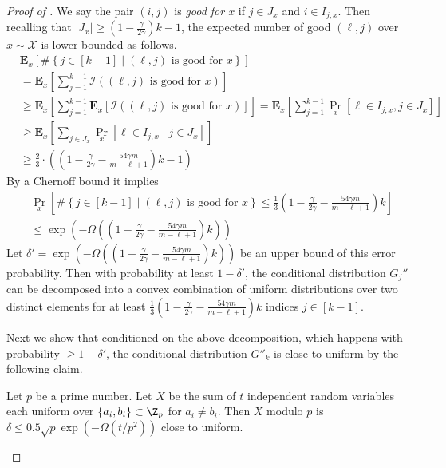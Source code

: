 \documentclass{toc}
\newcommand{\set}[1]{{\left \{{#1} \right \}}}
\newcommand{\st}{\;|\;}
\newcommand{\cond}{\;|\;}
\newcommand{\follows}{\ensuremath{\sim}}
\newcommand{\error}{\ensuremath{\delta}}
\newcommand{\bigomega}[1]{\ensuremath{{\Omega \left( {#1} \right)}}}
\newcommand{\E}{\ensuremath{\mathbf{E}}}
\begin{document}
\begin{proof}[Proof of ]
		We say the pair $(i,j)$ is \emph{good for $x$} if $j\in J_{x}$ and $i\in I_{j,x}$.
		Then recalling that $|J_x|\ge \left(1-\frac{\gamma}{2\gamma}\right)k-1$, the expected number of good $(\ell,j)$ over $x\follows\mathcal{X}$ is lower bounded as follows.
		\begin{align*}
			& \E_x\left[ \#\set{j\in [k-1]\st \text{$(\ell,j)$ is good for $x$}} \right]  \\
			&= \E_x\left[ \sum_{j=1}^{k-1} \mathcal{I}\left(\text{$(\ell,j)$ is good for $x$}\right) \right] \\
			&\ge  \E_x\left[ \sum_{j=1}^{k-1} \E_x\left[\mathcal{I}\left(\text{$(\ell,j)$ is good for $x$}\right)\right] \right] 
			= \E_x\left[ \sum_{j=1}^{k-1} \Pr_x[\ell \in I_{j,x}, j\in J_x] \right]\\
			&\ge  \E_x\left[ \sum_{j\in J_x} \Pr_x[\ell \in I_{j,x}\cond j\in J_x] \right] \\
			&\ge  \frac{2}{3}\cdot\left(\left(1-\frac{\gamma}{2\gamma}- \frac {54\gamma m}{m-\ell+1}\right)k-1\right)
		\end{align*}
		By a Chernoff bound it implies
		\begin{align*}
			& \Pr_x\left[ \#\set{j\in [k-1]\st \text{$(\ell,j)$ is good for $x$}} \le \frac{1}{3} \left(1-\frac{\gamma}{2\gamma} - \frac {54\gamma m}{m-\ell+1}\right)k \right]\\
		&\le \exp\left( -\bigomega{\left(1-\frac{\gamma}{2\gamma}- \frac {54\gamma m}{m-\ell+1}\right)k} \right)
		\end{align*}
		Let $\error' = \exp\left( -\bigomega{\left(1-\frac{\gamma}{2\gamma}- \frac {54\gamma m}{m-\ell+1}\right)k} \right)$ be an upper bound of this error probability.
		Then with probability at least $1-\error'$, the conditional distribution %
		$G_j''$ can be decomposed into a convex combination of uniform distributions over two distinct elements for at least $\frac{1}{3} \left(1-\frac{\gamma}{2\gamma}- \frac {54\gamma m}{m-\ell+1}\right)k$ indices $j\in [k-1]$.

		Next we show that conditioned on the above decomposition, 
		which happens with probability $\ge 1-\error'$,
		the conditional distribution $G''_k$ is close to uniform by the following claim.
		\begin{claim}
			Let $p$ be a prime number. 
			Let $X$ be the sum of $t$ independent random variables each uniform over $\set{a_i,b_i}\subset\Z_p$ for $a_i\ne b_i$.
			Then $X$ modulo $p$ is $\error\le 0.5\sqrt{p}\exp\left(-\bigomega{t/p^2} \right)$ close to uniform.
		\end{claim}
		

\end{proof}
\end{document}
